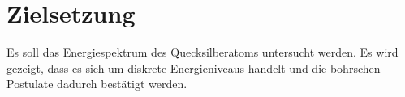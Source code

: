 
\section{Zielsetzung}
\label{sec:Zielsetzung}
Es soll das Energiespektrum des Quecksilberatoms untersucht werden.
 Es wird gezeigt, dass es sich um diskrete Energieniveaus handelt und die bohrschen Postulate dadurch bestätigt werden.
